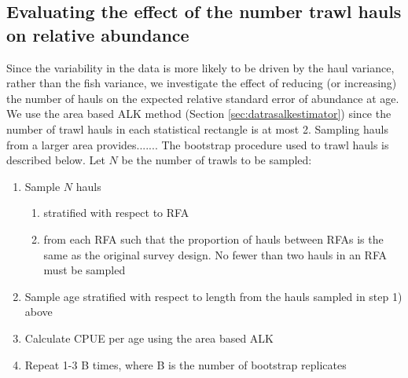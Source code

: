 \documentclass[a4paper 12pt]{article}
\numberwithin{equation}{section}
\begin{document}
\subsection{Evaluating the effect of the number trawl hauls on relative abundance}
\label{sec:evaluatingtrawlhauls}
Since the variability in the data is more likely to be driven by the haul variance, rather than the fish variance, we investigate the effect of reducing (or increasing) the number of hauls on the expected relative standard error of abundance at age. We use the area based ALK method (Section \ref{sec:datrasalkestimator}) since the number of trawl hauls in each statistical rectangle is at most 2. Sampling hauls from a larger area provides....... The bootstrap procedure used to trawl hauls is described below. Let $N$ be the number of trawls to be sampled:
\begin{enumerate}
\item Sample $N$ hauls
     \begin{enumerate}
      \item stratified with respect to RFA
      \item from each RFA such that the proportion of hauls between RFAs is the same as the original survey design. No fewer than two hauls in an RFA must be sampled
      \end{enumerate} 
\item Sample age stratified with respect to length from the hauls sampled in step 1) above
\item Calculate CPUE per age using the area based ALK
\item Repeat 1-3 B times, where B is the number of bootstrap replicates
\end{enumerate}
\end{document}
